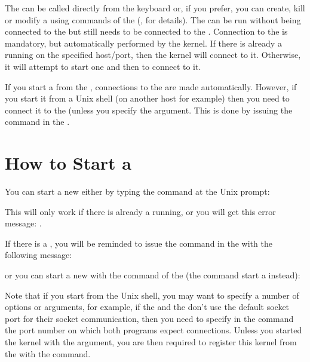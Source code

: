 The \COPRS{} can be called directly from the keyboard or, if you prefer, you can
create, kill or modify a \CPK{} using commands of the \OPRSS{}
(, for details). The \CPK{} can be run
without being connected to the \OPRSS{} but still needs to be connected to
the \MP{}. Connection to the \MP  is mandatory, but  automatically performed by
the kernel. If there is already a \MP{} running on the specified host/port,
then  the kernel will connect to it. Otherwise, it will attempt to start one
and then to connect to it.

If you start a \CPK{} from the \OPRSS{}, connections to the \OPRSS{}
are made automatically. However, if you start it from a Unix shell (on another
host for example) then you need to connect it to the \OPRSS{} (unless you
specify the  argument. This is done by issuing the 
command in the \OPRSS{}.

\section{How to Start a \CPK{}}


You can start a new \CPK{} either by typing the command 
at the Unix prompt:


This will only work if there is already a \OPRSS{} running, or you will get
this error message:\* 
.

If there is a \OPRSS{}, you will be reminded to issue the 
command in the \OPRSS{} with the following message:\*

or you can start a new \CPK{} with the  command of the \OPRSS{}
(the  command start a \XPK{} instead):


Note that if you start \COPRS{} from the Unix shell, you may want to specify a
number of options or arguments, for example, if the \OPRSS{} and the
\MP{} don't use the default socket port for their socket communication,
then you need to specify in the  command the port number on which
both programs expect connections. Unless you started the kernel with the
 argument, you are then required to register this kernel from the
\OPRSS{} with the  command.

